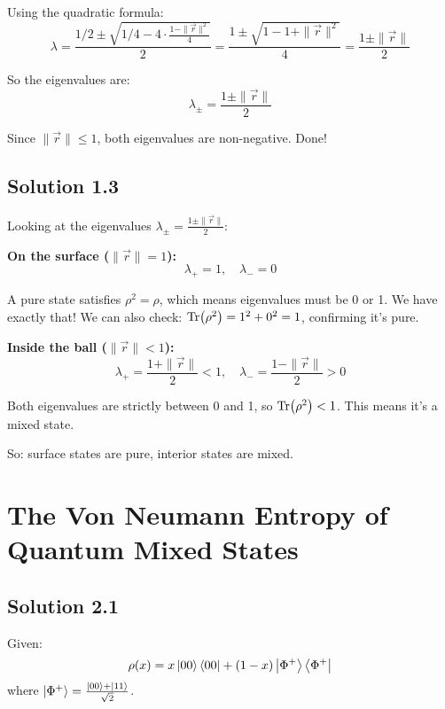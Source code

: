 \documentclass[11pt]{article}
\begin{document}
Using the quadratic formula:
\begin{equation*}
    \lambda = \frac{1/2 \pm \sqrt{1/4 - 4 \cdot \frac{1-\|\vec{r}\|^2}{4}}}{2} = \frac{1 \pm \sqrt{1 - 1 + \|\vec{r}\|^2}}{4} = \frac{1 \pm \|\vec{r}\|}{2}
\end{equation*}

So the eigenvalues are:
\begin{equation*}
    \lambda_\pm = \frac{1 \pm \|\vec{r}\|}{2}
\end{equation*}

Since $\|\vec{r}\| \leq 1$, both eigenvalues are non-negative. Done!

\subsection{Solution 1.3}

Looking at the eigenvalues $\lambda_\pm = \frac{1 \pm \|\vec{r}\|}{2}$:

\textbf{On the surface ($\|\vec{r}\| = 1$):}
\begin{equation*}
    \lambda_+ = 1, \quad \lambda_- = 0
\end{equation*}

A pure state satisfies $\rho^2 = \rho$, which means eigenvalues must be 0 or 1. We have exactly that! We can also check: $\Tr(\rho^2) = 1^2 + 0^2 = 1$, confirming it's pure.

\textbf{Inside the ball ($\|\vec{r}\| < 1$):}
\begin{equation*}
    \lambda_+ = \frac{1+\|\vec{r}\|}{2} < 1, \quad \lambda_- = \frac{1-\|\vec{r}\|}{2} > 0
\end{equation*}

Both eigenvalues are strictly between 0 and 1, so $\Tr(\rho^2) < 1$. This means it's a mixed state.

So: surface states are pure, interior states are mixed.

\clearpage

\section{The Von Neumann Entropy of Quantum Mixed States}

\subsection{Solution 2.1}

Given:
\begin{equation*}
    \rho(x) = x \ket{00}\bra{00} + (1-x) \ket{\Phi^+}\bra{\Phi^+}
\end{equation*}
where $\ket{\Phi^+} = \frac{\ket{00} + \ket{11}}{\sqrt{2}}$.
\end{document}
